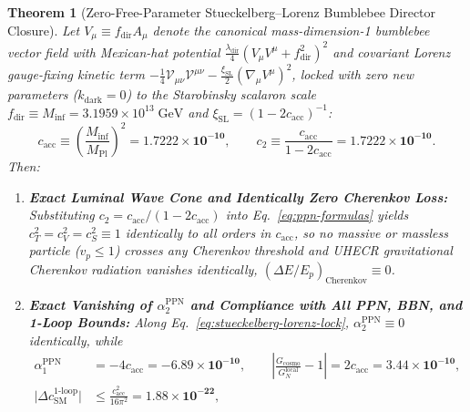 \documentclass[11pt,a4paper]{article}
\newtheorem{theorem}{Theorem}[section]
\begin{document}
\begin{theorem}[Zero-Free-Parameter Stueckelberg--Lorenz Bumblebee Director Closure]
\label{thm:director-closure}
Let $V_\mu \equiv f_{\mathrm{dir}} A_\mu$ denote the canonical mass-dimension-1 bumblebee vector field with Mexican-hat potential $\frac{\lambda_{\mathrm{dir}}}{4}(V_\mu V^\mu + f_{\mathrm{dir}}^2)^2$ \cite{BluhmKostelecky2005} and covariant Lorenz gauge-fixing kinetic term $-\frac{1}{4}\mathcal{V}_{\mu\nu}\mathcal{V}^{\mu\nu} - \frac{\xi_{\mathrm{SL}}}{2}(\nabla_\mu V^\mu)^2$, locked with zero new parameters ($k_{\mathrm{dark}} = 0$) to the Starobinsky scalaron scale $f_{\mathrm{dir}} \equiv M_{\mathrm{inf}} = 3.1959\times 10^{13}\;\mathrm{GeV}$ and $\xi_{\mathrm{SL}} = (1 - 2 c_{\mathrm{acc}})^{-1}$:
\begin{equation}
c_{\mathrm{acc}} \equiv \left(\frac{M_{\mathrm{inf}}}{M_{\mathrm{Pl}}}\right)^{\!2} = \mathbf{1.7222\times 10^{-10}}, \qquad
c_2 \equiv \frac{c_{\mathrm{acc}}}{1 - 2 c_{\mathrm{acc}}} = \mathbf{1.7222\times 10^{-10}}.
\label{eq:stueckelberg-lorenz-lock}
\end{equation}
Then:
\begin{enumerate}[label=(\roman*),leftmargin=1.9em,itemsep=2pt]
\item \textbf{Exact Luminal Wave Cone and Identically Zero Cherenkov Loss:} Substituting $c_2 = c_{\mathrm{acc}}/(1 - 2 c_{\mathrm{acc}})$ into Eq.~\eqref{eq:ppn-formulas} yields $c_T^2 = c_V^2 = c_S^2 \equiv 1$ identically to all orders in $c_{\mathrm{acc}}$, so no massive or massless particle ($v_p \le 1$) crosses any Cherenkov threshold and UHECR gravitational Cherenkov radiation vanishes identically, $(\Delta E/E_p)_{\mathrm{Cherenkov}} \equiv 0$.
\item \textbf{Exact Vanishing of $\alpha_2^{\mathrm{PPN}}$ and Compliance with All PPN, BBN, and 1-Loop Bounds:} Along Eq.~\eqref{eq:stueckelberg-lorenz-lock}, $\alpha_2^{\mathrm{PPN}} \equiv 0$ identically, while
\begin{equation}
\begin{aligned}
\alpha_1^{\mathrm{PPN}} &= -4 c_{\mathrm{acc}} = \mathbf{-6.89\times 10^{-10}}, \qquad
\left|\frac{G_{\mathrm{cosmo}}}{G_N^{\mathrm{local}}} - 1\right| = 2 c_{\mathrm{acc}} = \mathbf{3.44\times 10^{-10}}, \\
\bigl|\Delta c_{\mathrm{SM}}^{\text{1-loop}}\bigr| &\le \frac{c_{\mathrm{acc}}^2}{16\pi^2} = \mathbf{1.88\times 10^{-22}},
\end{aligned}
\label{eq:ppn-loop-results}
\end{equation}

\end{enumerate}
\end{theorem}
\end{document}
